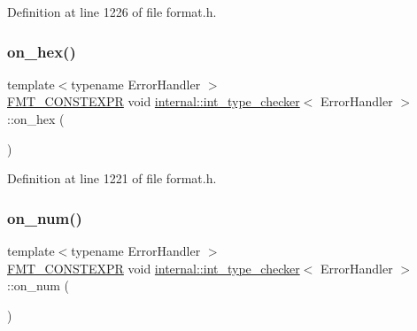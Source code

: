 Definition at line 1226 of file format.\+h.

\mbox{\label{classinternal_1_1int__type__checker_ac20c7c499f7a4f0cdab9d3c0422fe1d0}} 
\subsubsection{\texorpdfstring{on\+\_\+hex()}{on\_hex()}}
{\footnotesize\ttfamily template$<$typename Error\+Handler $>$ \\
\hyperlink{core_8h_a69201cb276383873487bf68b4ef8b4cd}{F\+M\+T\+\_\+\+C\+O\+N\+S\+T\+E\+X\+PR} void \hyperlink{classinternal_1_1int__type__checker}{internal\+::int\+\_\+type\+\_\+checker}$<$ Error\+Handler $>$\+::on\+\_\+hex (\begin{DoxyParamCaption}{ }\end{DoxyParamCaption})\hspace{0.3cm}{\ttfamily [inline]}}



Definition at line 1221 of file format.\+h.

\mbox{\label{classinternal_1_1int__type__checker_a909fd19b4b6f6a60050328e53b27305c}} 
\subsubsection{\texorpdfstring{on\+\_\+num()}{on\_num()}}
{\footnotesize\ttfamily template$<$typename Error\+Handler $>$ \\
\hyperlink{core_8h_a69201cb276383873487bf68b4ef8b4cd}{F\+M\+T\+\_\+\+C\+O\+N\+S\+T\+E\+X\+PR} void \hyperlink{classinternal_1_1int__type__checker}{internal\+::int\+\_\+type\+\_\+checker}$<$ Error\+Handler $>$\+::on\+\_\+num (\begin{DoxyParamCaption}{ }\end{DoxyParamCaption})\hspace{0.3cm}{\ttfamily [inline]}}



